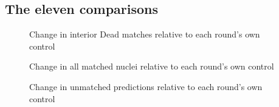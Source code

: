 \documentclass[
  11pt,
]{article}
\begin{document}
\subsection{The eleven comparisons}\label{the-eleven-comparisons}

\begin{figure}[H]\centering

\caption{Change in interior Dead matches relative to each round's own control}
\end{figure}

\begin{figure}[H]\centering

\caption{Change in all matched nuclei relative to each round's own control}
\end{figure}

\begin{figure}[H]\centering

\caption{Change in unmatched predictions relative to each round's own control}
\end{figure}
\end{document}
